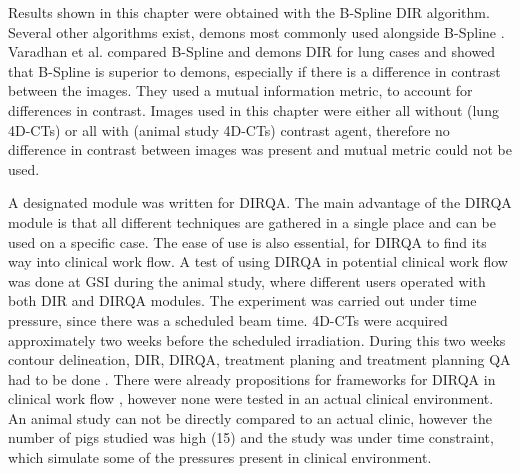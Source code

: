 Results shown in this chapter were obtained with the B-Spline DIR algorithm. Several other algorithms exist, demons most commonly used alongside B-Spline \cite{Thirion1998}. Varadhan et al. compared B-Spline and demons DIR
for lung cases \cite{Varadhan2013} and showed that B-Spline is superior to demons, especially if there is a difference in contrast between the images. They used a mutual information
metric, to account for differences in contrast. Images used in this chapter were either all without (lung 4D-CTs) or all with (animal study 4D-CTs) contrast agent, therefore no difference in contrast
between images was present and mutual metric could not be used.

A designated module was written for DIRQA. The main advantage of the DIRQA module is that all different techniques are gathered in a single place and can be used on a specific case. 
The ease of use is also essential, for DIRQA to find its way into clinical work flow.
A test of using DIRQA in potential clinical work flow was done at GSI during the animal study, where different users operated with both DIR and DIRQA modules. The experiment was carried out under time pressure, since there was
a scheduled beam time. 4D-CTs were acquired approximately two weeks before the scheduled irradiation. During this two weeks contour delineation, DIR, DIRQA, treatment planing 
and treatment planning QA had to be done \cite{Graeff2014a}.
There were already propositions for frameworks for DIRQA in clinical work flow \cite{Varadhan2013}, however none were tested in an actual clinical environment. An animal study can not be directly compared to an actual clinic,
however the number of pigs studied was high (15) and the study was under time constraint, which simulate some of the pressures present in clinical environment.

